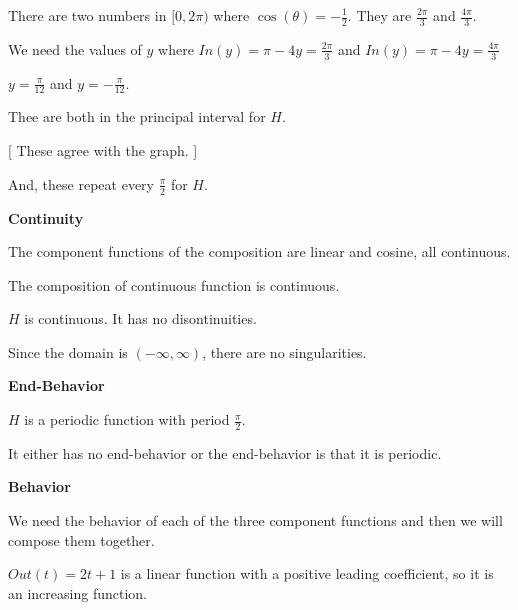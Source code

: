 \documentclass{ximera}
\begin{document}
There are two numbers in $[0, 2\pi)$ where $\cos(\theta) = -\frac{1}{2}$.  They are $\frac{2\pi}{3}$ and $\frac {4\pi}{3}$.

We need the values of $y$ where $In(y) = \pi - 4y = \frac{2\pi}{3}$ and $In(y) = \pi - 4y = \frac{4\pi}{3}$

$y = \frac{\pi}{12}$  and   $y = -\frac{\pi}{12}$.

Thee are both in the principal interval for $H$. 

[ These agree with the graph. ]


And, these repeat every $\frac{\pi}{2}$ for $H$.

















\textbf{\textcolor{blue!55!black}{Continuity}}


The component functions of the composition are linear and cosine, all continuous. 

The composition of continuous function is continuous.

$H$ is continuous. It has no disontinuities. 


Since the domain is $(-\infty, \infty)$, there are no singularities. 








\textbf{\textcolor{blue!55!black}{End-Behavior}}


$H$ is a periodic function with period $\frac{\pi}{2}$. 

It either has no end-behavior or the end-behavior is that it is periodic.

















\textbf{\textcolor{blue!55!black}{Behavior}}


We need the behavior of each of the three component functions and then we will compose them together. 




$Out(t) = 2t + 1$ is a linear function with a positive leading coefficient, so it is an increasing function.
\end{document}
